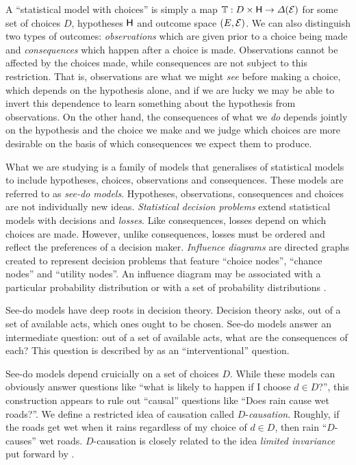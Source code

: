A ``statistical model with choices'' is simply a map $\mathbb{T}:D\times \mathsf{H}\to \Delta(\mathcal{E})$ for some set of choices $D$, hypotheses $\mathsf{H}$ and outcome space $(E,\mathcal{E})$. We can also distinguish two types of outcomes: \emph{observations} which are given prior to a choice being made and \emph{consequences} which happen after a choice is made. Observations cannot be affected by the choices made, while consequences are not subject to this restriction. That is, observations are what we might \emph{see} before making a choice, which depends on the hypothesis alone, and if we are lucky we may be able to invert this dependence to learn something about the hypothesis from observations. On the other hand, the consequences of what we \emph{do} depends jointly on the hypothesis and the choice we make and we judge which choices are more desirable on the basis of which consequences we expect them to produce. 

What we are studying is a family of models that generalises of statistical models to include hypotheses, choices, observations and consequences. These models are referred to as \emph{see-do models}. Hypotheses, observations, consequences and choices are not individually new ideas. \emph{Statistical decision problems} \citep{wald_statistical_1950,savage_foundations_1972} extend statistical models with decisions and \emph{losses}. Like consequences, losses depend on which choices are made. However, unlike consequences, losses must be ordered and reflect the preferences of a decision maker. \emph{Influence diagrams} are directed graphs created to represent decision problems that feature ``choice nodes'', ``chance nodes'' and ``utility nodes''. An influence diagram may be associated with a particular probability distribution \cite{nilsson_evaluating_2013} or with a set of probability distributions \cite{dawid_influence_2002}.

See-do models have deep roots in decision theory. Decision theory asks, out of a set of available acts, which ones ought to be chosen. See-do models answer an intermediate question: out of a set of available acts, what are the consequences of each? This question is described by \citet{pearl_causality:_2009} as an ``interventional'' question.

See-do models depend cruicially on a set of choices $D$. While these models can obviously answer questions like ``what is likely to happen if I choose $d\in D$?'', this construction appears to rule out ``causal'' questions like ``Does rain cause wet roads?''. We define a restricted idea of causation called $D$-\emph{causation}. Roughly, if the roads get wet when it rains regardless of my choice of $d\in D$, then rain ``$D$-causes'' wet roads. $D$-causation is closely related to the idea \emph{limited invariance} put forward by \citet{heckerman_decision-theoretic_1995}.

